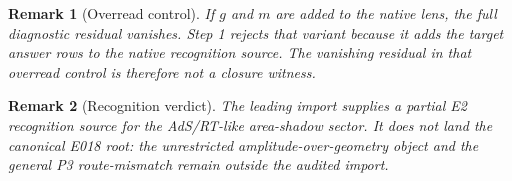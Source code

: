 \documentclass[11pt]{article}
\newtheorem{remark}{Remark}
\begin{document}
\begin{remark}[Overread control]
If \(g\) and \(m\) are added to the native lens, the full diagnostic residual
vanishes.  Step 1 rejects that variant because it adds the target answer rows
to the native recognition source.  The vanishing residual in that overread
control is therefore not a closure witness.
\end{remark}

\begin{remark}[Recognition verdict]
The leading import supplies a partial E2 recognition source for the
AdS/RT-like area-shadow sector.  It does not land the canonical E018 root:
the unrestricted amplitude-over-geometry object and the general P3
route-mismatch remain outside the audited import.
\end{remark}
\end{document}
